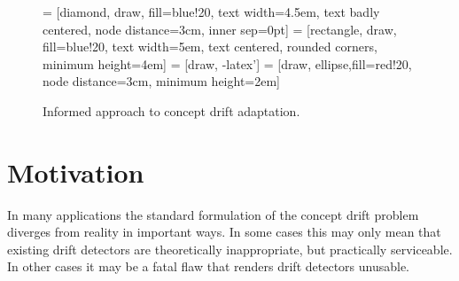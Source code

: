 \begin{figure}
    \centering
    
     = [diamond, draw, fill=blue!20, 
        text width=4.5em, text badly centered, node distance=3cm, inner sep=0pt]
     = [rectangle, draw, fill=blue!20, 
        text width=5em, text centered, rounded corners, minimum height=4em]
     = [draw, -latex']
     = [draw, ellipse,fill=red!20, node distance=3cm,
        minimum height=2em]
    
    \caption{Informed approach to concept drift adaptation.}
    \label{fig:standard_adaptation}
\end{figure}

\section{Motivation}

In many applications the standard formulation of the concept drift problem diverges from reality in important ways. In some cases this may only mean that existing drift detectors are theoretically inappropriate, but practically serviceable. In other cases it may be a fatal flaw that renders drift detectors unusable.

